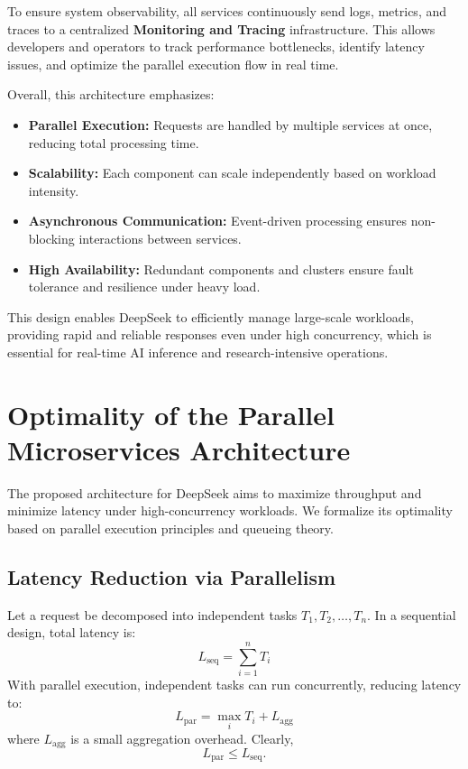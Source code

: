 \documentclass[a4paper,11pt]{article}
\begin{document}
To ensure system observability, all services continuously send logs, metrics, and traces to a centralized \textbf{Monitoring and Tracing} infrastructure. This allows developers and operators to track performance bottlenecks, identify latency issues, and optimize the parallel execution flow in real time.

Overall, this architecture emphasizes:
\begin{itemize}
    \item \textbf{Parallel Execution:} Requests are handled by multiple services at once, reducing total processing time.
    \item \textbf{Scalability:} Each component can scale independently based on workload intensity.
    \item \textbf{Asynchronous Communication:} Event-driven processing ensures non-blocking interactions between services.
    \item \textbf{High Availability:} Redundant components and clusters ensure fault tolerance and resilience under heavy load.
\end{itemize}

This design enables DeepSeek to efficiently manage large-scale workloads, providing rapid and reliable responses even under high concurrency, which is essential for real-time AI inference and research-intensive operations.
\section{Optimality of the Parallel Microservices Architecture}

The proposed architecture for DeepSeek aims to maximize throughput and minimize latency under high-concurrency workloads. We formalize its optimality based on parallel execution principles and queueing theory.

\subsection{Latency Reduction via Parallelism}

Let a request be decomposed into independent tasks $T_1, T_2, \dots, T_n$. In a sequential design, total latency is:
\[
L_{\text{seq}} = \sum_{i=1}^{n} T_i
\]
With parallel execution, independent tasks can run concurrently, reducing latency to:
\[
L_{\text{par}} = \max_{i} T_i + L_{\text{agg}}
\]
where $L_{\text{agg}}$ is a small aggregation overhead. Clearly,
\[
L_{\text{par}} \le L_{\text{seq}}.
\]
\end{document}
